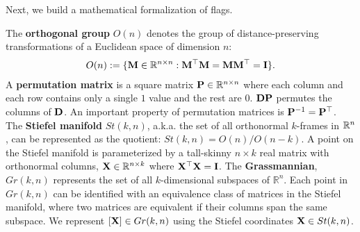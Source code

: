 \begin{comment}
\begin{table}[t]
    \centering
    \caption{Computing the chordal distance on Stiefel, Grassmann, and flag manifolds using matrix representatives.}
    \setlength{\tabcolsep}{2pt}
    \small 
    \renewcommand{\arraystretch}{1.3}
    \begin{tabular}{l|l}
        \toprule
        \textbf{Representation / Manifold} & \textbf{Chordal Distance} \\
        \midrule
        $\mathrm{St}(n_k,n)$ & $\|\X - \Y\|_F$ \\
        $\mathrm{Gr}(n_k,n)$ & $\dfrac{1}{\sqrt{2}}\,\|\X\X^\top - \Y\Y^\top\|_F$ \\
        $\mathrm{Flag}(n_1,...,n_k;n)$ & $\sqrt{\dfrac{1}{2}\sum_{i=1}^k\|\X_i\X_i^\top - \Y_i\Y_i^\top\|_F^2}$ \\
        \bottomrule
    \end{tabular}
    \label{tab:chordaldist}
\end{table}
\end{comment}

\noindent Next, we build a mathematical formalization of flags.

\begin{dfn} The \textbf{orthogonal group} $O(n)$ denotes the group of distance-preserving transformations of a Euclidean space of dimension $n$:
\begin{align}
    O(n) := \{ \mathbf{M} \in \mathbb{R}^{n \times n} : \mathbf{M}^\top \mathbf{M} =\mathbf{M}\mathbf{M}^\top = \mathbf{I}\}.
\end{align}
A \textbf{permutation matrix} is a square matrix $\mathbf{P} \in \mathbb{R}^{n \times n}$ where each column and each row contains only a single $1$ value and the rest are $0$. $\mathbf{D}\mathbf{P}$ permutes the columns of $\mathbf{D}$.
An important property of permutation matrices is $\mathbf{P}^{-1} = \mathbf{P}^\top$.
\noindent The \textbf{Stiefel manifold} $St(k,n)$, a.k.a. the set of all orthonormal $k$-frames in $\mathbb{R}^n$, can be represented as the quotient: $St(k,n) = O(n)/O(n-k)$. A point on the Stiefel manifold is parameterized by a tall-skinny $n \times k$ real matrix with orthonormal columns, \ie $\mathbf{X} \in \mathbb{R}^{n \times k}$ where $\mathbf{X}^\top \mathbf{X} = \mathbf{I}$.
\noindent The \textbf{Grassmannian}, $ Gr(k, n) $ represents the set of all $k $-dimensional subspaces of $ \mathbb{R}^n $. Each point in $ Gr(k, n) $ can be identified with an equivalence class of matrices in the Stiefel manifold, where two matrices are equivalent if their columns span the same subspace. 
We represent $[\mathbf{X}] \in Gr(k,n)$ using the Stiefel coordinates
$\mathbf{X} \in St(k,n)$.
\end{dfn}


